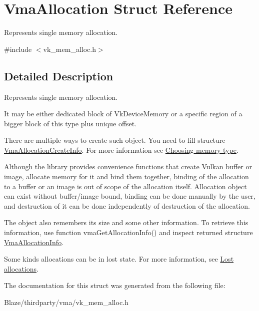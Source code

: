 \hypertarget{structVmaAllocation}{}\section{Vma\+Allocation Struct Reference}
\label{structVmaAllocation}


Represents single memory allocation.  




{\ttfamily \#include $<$vk\+\_\+mem\+\_\+alloc.\+h$>$}



\subsection{Detailed Description}
Represents single memory allocation. 

It may be either dedicated block of {\ttfamily Vk\+Device\+Memory} or a specific region of a bigger block of this type plus unique offset.

There are multiple ways to create such object. You need to fill structure \hyperlink{structVmaAllocationCreateInfo}{Vma\+Allocation\+Create\+Info}. For more information see \hyperlink{choosing_memory_type}{Choosing memory type}.

Although the library provides convenience functions that create Vulkan buffer or image, allocate memory for it and bind them together, binding of the allocation to a buffer or an image is out of scope of the allocation itself. Allocation object can exist without buffer/image bound, binding can be done manually by the user, and destruction of it can be done independently of destruction of the allocation.

The object also remembers its size and some other information. To retrieve this information, use function vma\+Get\+Allocation\+Info() and inspect returned structure \hyperlink{structVmaAllocationInfo}{Vma\+Allocation\+Info}.

Some kinds allocations can be in lost state. For more information, see \hyperlink{lost_allocations}{Lost allocations}. 

The documentation for this struct was generated from the following file\+:\begin{DoxyCompactItemize}
\item 
Blaze/thirdparty/vma/vk\+\_\+mem\+\_\+alloc.\+h\end{DoxyCompactItemize}

